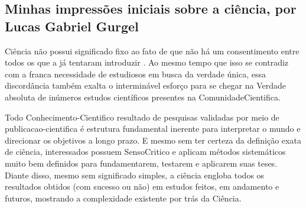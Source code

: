 \subsection{Minhas impressões iniciais sobre a ciência, por Lucas Gabriel Gurgel}


Ciência não possui significado fixo ao fato de que não há um consentimento entre todos os que a já tentaram introduzir \citep{schwartzman_ciencia_1984}. Ao mesmo tempo que isso se contradiz com a franca necessidade de estudiosos em busca da verdade única, essa discordância também exalta o interminável esforço para se chegar na Verdade absoluta de inúmeros estudos científicos presentes na \gls{ComunidadeCientifica}.

Todo \gls{Conhecimento-Cientifico} resultado de pesquisas validadas por meio de \gls{publicacao-cientifica} é estrutura fundamental inerente para interpretar o mundo e direcionar os objetivos a longo prazo. E mesmo sem ter certeza da definição exata de ciência, interessados possuem \gls{SensoCritico} e aplicam métodos sistemáticos muito bem definidos para fundamentarem, testarem e aplicarem suas teses. Diante disso, mesmo sem significado simples, a ciência engloba todos os resultados obtidos (com sucesso ou não) em estudos feitos, em andamento e futuros, mostrando a complexidade existente por trás da Ciência.

